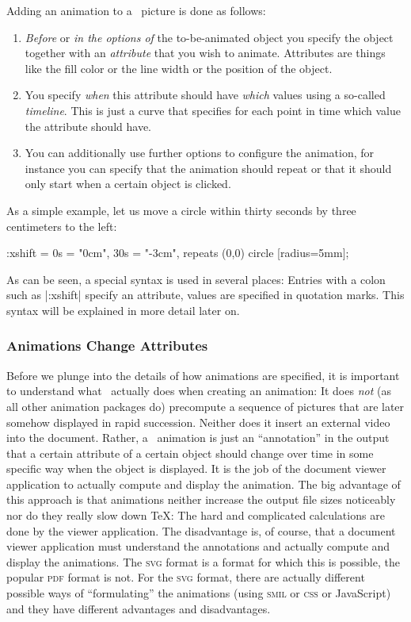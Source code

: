 Adding an animation to a \tikzname\ picture is done as follows:
%
\begin{enumerate}
    \item \emph{Before} or \emph{in the options of} the to-be-animated object
        you specify the object together with an \emph{attribute} that you wish
        to animate. Attributes are things like the fill color or the line width
        or the position of the object.
    \item You specify \emph{when} this attribute should have \emph{which}
        values using a so-called \emph{timeline}. This is just a curve that
        specifies for each point in time which value the attribute should have.
    \item You can additionally use further options to configure the animation,
        for instance you can specify that the animation should repeat or that
        it should only start when a certain object is clicked.
\end{enumerate}

As a simple example, let us move a circle within thirty seconds by three
centimeters to the left:
%
\begin{codeexample}[imagesource={standalone/pgfmanual-en-tikz-animations-animation-2.svg}]
\tikz \draw :xshift = {0s = "0cm", 30s = "-3cm", repeats} (0,0) circle [radius=5mm];
\end{codeexample}

As can be seen, a special syntax is used in several places: Entries with a
colon such as |:xshift| specify an attribute, values are specified in quotation
marks. This syntax will be explained in more detail later on.


\subsubsection{Animations Change Attributes}

Before we plunge into the details of how animations are specified, it is
important to understand what \tikzname\ actually does when creating an
animation: It does \emph{not} (as all other animation packages do) precompute a
sequence of pictures that are later somehow displayed in rapid succession.
Neither does it insert an external video into the document. Rather, a
\tikzname\ animation is just an ``annotation'' in the output that a certain
attribute of a certain object should change over time in some specific way when
the object is displayed. It is the job of the document viewer application to
actually compute and display the animation. The big advantage of this approach
is that animations neither increase the output file sizes noticeably nor do
they really slow down \TeX: The hard and complicated calculations are done by
the viewer application. The disadvantage is, of course, that a document viewer
application must understand the annotations and actually compute and display
the animations. The \textsc{svg} format is a format for which this is possible,
the popular \textsc{pdf} format is not. For the \textsc{svg} format, there are
actually different possible ways of ``formulating'' the animations (using
\textsc{smil} or \textsc{css} or JavaScript) and they have different advantages
and disadvantages.

